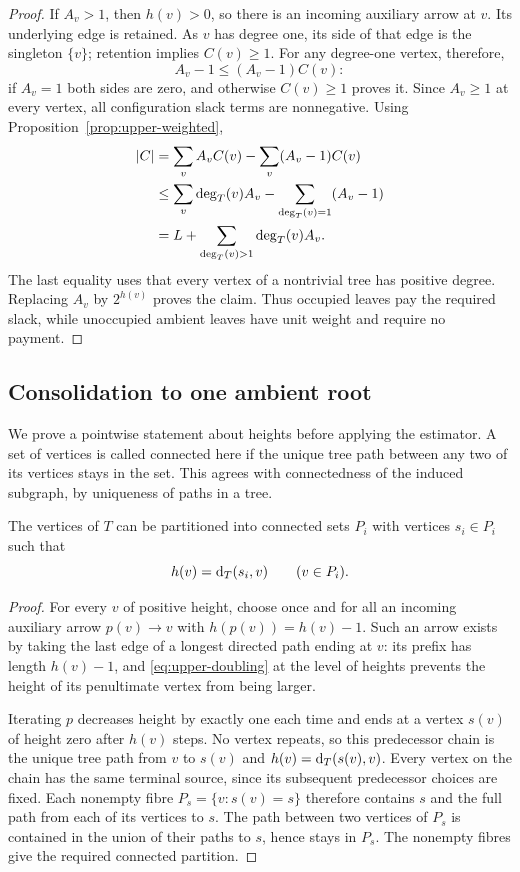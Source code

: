\begin{proof}
If $A_v>1$, then $h(v)>0$, so there is an incoming auxiliary arrow at
$v$.  Its underlying edge is retained.  As $v$ has degree one, its side
of that edge is the singleton $\{v\}$; retention implies $C(v)\geq1$.
For any degree-one vertex, therefore,
\[
 A_v-1\leq (A_v-1)C(v):
\]
if $A_v=1$ both sides are zero, and otherwise $C(v)\geq1$ proves it.
Since $A_v\geq1$ at every vertex, all configuration slack terms are
nonnegative.  Using Proposition~\ref{prop:upper-weighted},
\begin{align*}
 \lvert C\rvert
 &=\sum_v A_vC(v)-\sum_v(A_v-1)C(v)\\
 &\leq\sum_v\deg_T(v)A_v
       -\sum_{\deg_T(v)=1}(A_v-1)\\
 &=L+\sum_{\deg_T(v)>1}\deg_T(v)A_v.
\end{align*}
The last equality uses that every vertex of a nontrivial tree has positive
degree.  Replacing $A_v$ by $2^{h(v)}$ proves the claim.  Thus occupied
leaves pay the required slack, while unoccupied ambient leaves have unit
weight and require no payment.
\end{proof}

\subsection{Consolidation to one ambient root}

We prove a pointwise statement about heights before applying the estimator.
A set of vertices is called connected here if the unique tree path between
any two of its vertices stays in the set.  This agrees with connectedness
of the induced subgraph, by uniqueness of paths in a tree.

\begin{lemma}\label{lem:upper-source-partition}
The vertices of $T$ can be partitioned into connected sets $P_i$ with
vertices $s_i\in P_i$ such that
\[
 h(v)=\operatorname{d}_T(s_i,v)\qquad(v\in P_i).
\]
\end{lemma}

\begin{proof}
For every $v$ of positive height, choose once and for all an incoming
auxiliary arrow $p(v)\to v$ with $h(p(v))=h(v)-1$.  Such an arrow
exists by taking the last edge of a longest directed path ending at $v$:
its prefix has length $h(v)-1$, and \eqref{eq:upper-doubling} at the level
of heights prevents the height of its penultimate vertex from being larger.

Iterating $p$ decreases height by exactly one each time and ends at a
vertex $s(v)$ of height zero after $h(v)$ steps.  No vertex repeats, so
this predecessor chain is the unique tree path from $v$ to $s(v)$ and
$h(v)=\operatorname{d}_T(s(v),v)$.  Every vertex on the chain has the same terminal
source, since its subsequent predecessor choices are fixed.  Each nonempty
fibre $P_s=\{v:s(v)=s\}$ therefore contains $s$ and the full path from
each of its vertices to $s$.  The path between two vertices of $P_s$ is
contained in the union of their paths to $s$, hence stays in $P_s$.
The nonempty fibres give the required connected partition.
\end{proof}

